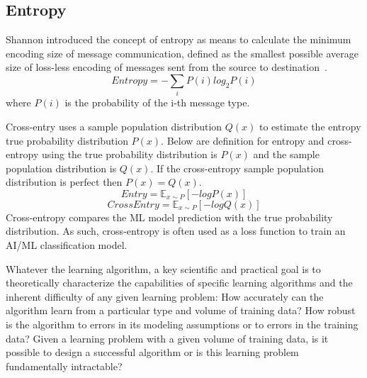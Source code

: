 \subsection{Entropy}
Shannon introduced the concept of entropy as means to calculate the minimum encoding size of message communication, defined as the smallest possible average size of loss-less encoding of messages sent from the source to destination~\cite{Shibuya}.
\begin{equation}
    Entropy = -\sum_{i} P(i) log_2 P(i) 
\end{equation}
where $P(i)$ is the probability of the i-th message type.

Cross-entry uses a sample population distribution $Q(x)$  to estimate the entropy true probability distribution  $P(x)$. Below are definition for entropy and cross-entropy using the true probability distribution is $P(x)$ and the sample population distribution is $Q(x)$. If the cross-entropy sample population distribution is perfect then $P(x) = Q(x)$.
\begin{equation}
    Entry = \mathbb{E}_{x\sim P}[-log P(x)] 
\end{equation}
\begin{equation}
    CrossEntry = \mathbb{E}_{x\sim P}[-log Q(x)] 
\end{equation}
Cross-entropy compares the ML model prediction with the true probability distribution. As such, cross-entropy is often used as a loss function to train an AI/ML classification model.


Whatever the learning algorithm, a key scientific and practical goal is to theoretically characterize the capabilities of specific learning algorithms and the inherent difficulty of any given learning problem: How accurately can the algorithm learn from a particular type and volume of training data? How robust is the algorithm to errors in its modeling assumptions or to errors in the training data? Given a learning problem with a given volume of training data, is it possible to design a successful algorithm or is this learning problem fundamentally intractable?

 